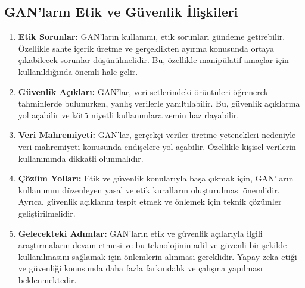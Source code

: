 \documentclass[12pt]{article}
\begin{document}
\subsection{GAN'ların Etik ve Güvenlik İlişkileri}
\begin{enumerate}[label=\textbf{\arabic*.}, leftmargin=*]
\item\textbf{Etik Sorunlar: }GAN'ların kullanımı, etik sorunları gündeme getirebilir. Özellikle sahte içerik üretme ve gerçeklikten ayırma konusunda ortaya çıkabilecek sorunlar düşünülmelidir. Bu, özellikle manipülatif amaçlar için kullanıldığında önemli hale gelir.

\item\textbf{Güvenlik Açıkları: }GAN'lar, veri setlerindeki örüntüleri öğrenerek tahminlerde bulunurken, yanlış verilerle yanıltılabilir. Bu, güvenlik açıklarına yol açabilir ve kötü niyetli kullanımlara zemin hazırlayabilir.

\item \textbf{Veri Mahremiyeti:} GAN'lar, gerçekçi veriler üretme yetenekleri nedeniyle veri mahremiyeti konusunda endişelere yol açabilir. Özellikle kişisel verilerin kullanımında dikkatli olunmalıdır.

\item\textbf{Çözüm Yolları:} Etik ve güvenlik konularıyla başa çıkmak için, GAN'ların kullanımını düzenleyen yasal ve etik kuralların oluşturulması önemlidir. Ayrıca, güvenlik açıklarını tespit etmek ve önlemek için teknik çözümler geliştirilmelidir.

\item\textbf{Gelecekteki Adımlar:} GAN'ların etik ve güvenlik açılarıyla ilgili araştırmaların devam etmesi ve bu teknolojinin adil ve güvenli bir şekilde kullanılmasını sağlamak için önlemlerin alınması gereklidir. Yapay zeka etiği ve güvenliği konusunda daha fazla farkındalık ve çalışma yapılması beklenmektedir.
\end{enumerate}
\end{document}
